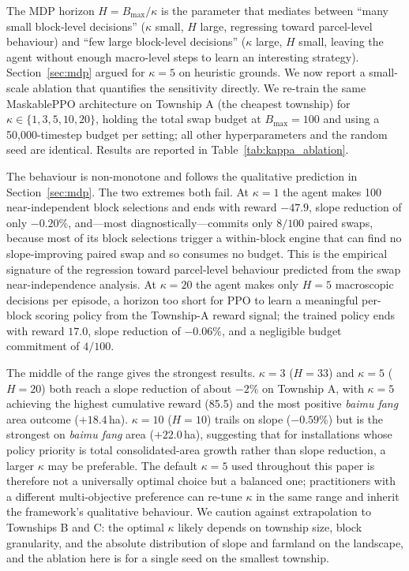 \documentclass[preprint,12pt]{elsarticle}
\begin{document}
The MDP horizon $H = B_{\max}/\kappa$ is the parameter that mediates between ``many small block-level decisions'' ($\kappa$ small, $H$ large, regressing toward parcel-level behaviour) and ``few large block-level decisions'' ($\kappa$ large, $H$ small, leaving the agent without enough macro-level steps to learn an interesting strategy). Section~\ref{sec:mdp} argued for $\kappa = 5$ on heuristic grounds. We now report a small-scale ablation that quantifies the sensitivity directly. We re-train the same MaskablePPO architecture on Township A (the cheapest township) for $\kappa \in \{1, 3, 5, 10, 20\}$, holding the total swap budget at $B_{\max} = 100$ and using a 50{,}000-timestep budget per setting; all other hyperparameters and the random seed are identical. Results are reported in Table~\ref{tab:kappa_ablation}.



The behaviour is non-monotone and follows the qualitative prediction in Section~\ref{sec:mdp}. The two extremes both fail. At $\kappa = 1$ the agent makes 100 near-independent block selections and ends with reward $-47.9$, slope reduction of only $-0.20\%$, and---most diagnostically---commits only $8/100$ paired swaps, because most of its block selections trigger a within-block engine that can find no slope-improving paired swap and so consumes no budget. This is the empirical signature of the regression toward parcel-level behaviour predicted from the swap near-independence analysis. At $\kappa = 20$ the agent makes only $H = 5$ macroscopic decisions per episode, a horizon too short for PPO to learn a meaningful per-block scoring policy from the Township-A reward signal; the trained policy ends with reward $17.0$, slope reduction of $-0.06\%$, and a negligible budget commitment of $4/100$.

The middle of the range gives the strongest results. $\kappa = 3$ ($H = 33$) and $\kappa = 5$ ($H = 20$) both reach a slope reduction of about $-2\%$ on Township A, with $\kappa = 5$ achieving the highest cumulative reward (85.5) and the most positive \textit{baimu fang} area outcome ($+18.4$\,ha). $\kappa = 10$ ($H = 10$) trails on slope ($-0.59\%$) but is the strongest on \textit{baimu fang} area ($+22.0$\,ha), suggesting that for installations whose policy priority is total consolidated-area growth rather than slope reduction, a larger $\kappa$ may be preferable. The default $\kappa = 5$ used throughout this paper is therefore not a universally optimal choice but a balanced one; practitioners with a different multi-objective preference can re-tune $\kappa$ in the same range and inherit the framework's qualitative behaviour. We caution against extrapolation to Townships B and C: the optimal $\kappa$ likely depends on township size, block granularity, and the absolute distribution of slope and farmland on the landscape, and the ablation here is for a single seed on the smallest township.
\end{document}
